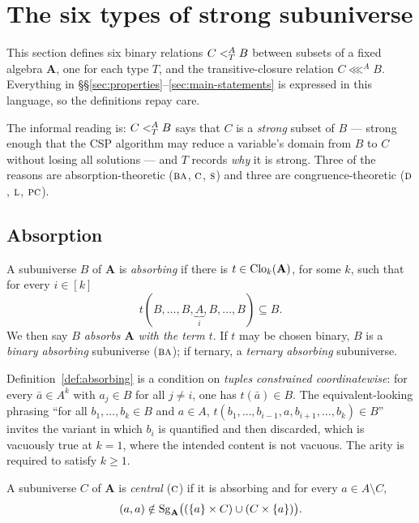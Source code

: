 \section{The six types of strong subuniverse}\label{sec:types}

This section defines six binary relations $C\subt[A]{T}B$ between subsets of a
fixed algebra $\mathbf A$, one for each type $T$, and the transitive-closure
relation $C\lll^{A}B$. Everything in
\S\S\ref{sec:properties}--\ref{sec:main-statements} is expressed in this
language, so the definitions repay care.

The informal reading is: $C\subt[A]{T}B$ says that $C$ is a \emph{strong}
subset of $B$ --- strong enough that the CSP algorithm may reduce a variable's
domain from $B$ to $C$ without losing all solutions --- and $T$ records
\emph{why} it is strong. Three of the reasons are absorption-theoretic
($\TBA$, $\TC$, $\TS$) and three are congruence-theoretic
($\TD$, $\TL$, $\TPC$).

\subsection{Absorption}

\begin{definition}\label{def:absorbing}
A subuniverse $B$ of $\mathbf A$ is \emph{absorbing} if there is
$t\in\Clo_{k}(\mathbf A)$, for some $k$, such that for every $i\in[k]$
\[
  t(B,\dots,B,\underbrace{A}_{i},B,\dots,B)\subseteq B .
\]
We then say \emph{$B$ absorbs $\mathbf A$ with the term $t$}. If $t$ may be
chosen binary, $B$ is a \emph{binary absorbing} subuniverse ($\TBA$); if
ternary, a \emph{ternary absorbing} subuniverse.
\end{definition}

\begin{hazard}\label{haz:absorption-tuples}
Definition~\ref{def:absorbing} is a condition on \emph{tuples constrained
coordinatewise}: for every $\bar a\in A^{k}$ with $a_{j}\in B$ for all
$j\neq i$, one has $t(\bar a)\in B$. The equivalent-looking phrasing ``for all
$b_{1},\dots,b_{k}\in B$ and $a\in A$,
$t(b_{1},\dots,b_{i-1},a,b_{i+1},\dots,b_{k})\in B$'' invites the variant in
which $b_{i}$ is quantified and then discarded, which is vacuously true at
$k=1$, where the intended content is not vacuous. The arity is required to
satisfy $k\ge1$.
\end{hazard}

\begin{definition}\label{def:central}
A subuniverse $C$ of $\mathbf A$ is \emph{central} ($\TC$) if it is absorbing
and for every $a\in A\setminus C$,
\[
  (a,a)\notin\Sg_{\mathbf A}\bigl((\{a\}\times C)\cup(C\times\{a\})\bigr).
\]
\end{definition}

